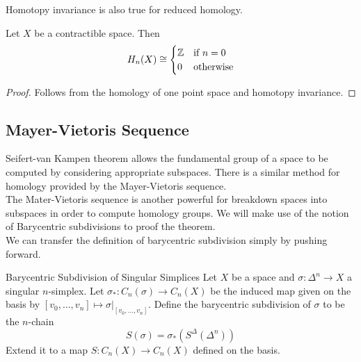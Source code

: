 \documentclass[a4paper]{article}
\begin{document}
Homotopy invariance is also true for reduced homology. 

\begin{eg}{}{} Let $X$ be a contractible space. Then $$H_n(X)\cong\begin{cases}
\mathbb{Z} & \text{if } n=0\\
0 & \text{otherwise}
\end{cases}$$ \tcbline
\begin{proof}
Follows from the homology of one point space and homotopy invariance. 
\end{proof}
\end{eg}

\subsection{Mayer-Vietoris Sequence}
Seifert-van Kampen theorem allows the fundamental group of a space to be computed by considering appropriate subspaces. There is a similar method for homology provided by the Mayer-Vietoris sequence. \\

The Mater-Vietoris sequence is another powerful for breakdown spaces into subspaces in order to compute homology groups. We will make use of the notion of Barycentric subdivisions to proof the theorem. \\

We can transfer the definition of barycentric subdivision simply by pushing forward. 

\begin{defn}{Barycentric Subdivision of Singular Simplices}{} Let $X$ be a space and $\sigma:\Delta^n\to X$ a singular $n$-simplex. Let $\sigma_\ast:C_n(\sigma)\to C_n(X)$ be the induced map given on the basis by $[v_0,\dots,v_n]\mapsto\sigma|_{[v_0,\dots,v_n]}$. Define the barycentric subdivision of $\sigma$ to be the $n$-chain $$S(\sigma)=\sigma_\ast(S^\Delta(\Delta^n))$$ Extend it to a map $S:C_n(X)\to C_n(X)$ defined on the basis. 
\end{defn}
\end{document}

